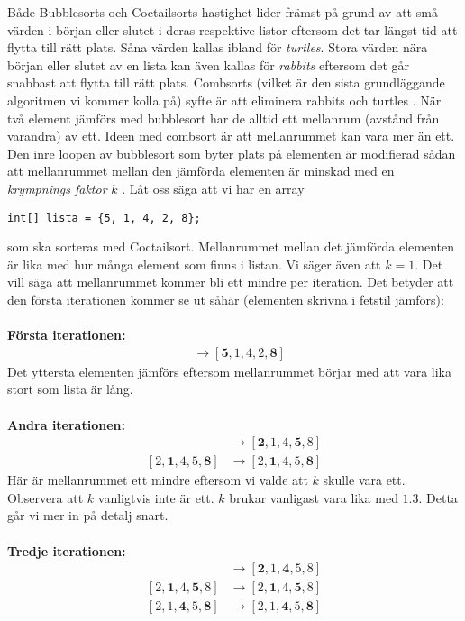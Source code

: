 \documentclass[a4, oneside]{report}
\begin{document}
Både Bubblesorts och Coctailsorts hastighet lider främst på grund av att små värden i början eller slutet i deras respektive listor eftersom det tar längst tid att flytta till rätt plats. Såna värden kallas ibland för \textit{turtles}. Stora värden nära början eller slutet av en lista kan även kallas för \textit{rabbits} eftersom det går snabbast att flytta till rätt plats. Combsorts (vilket är den sista grundläggande algoritmen vi kommer kolla på) syfte är att eliminera rabbits och turtles \cite{10}. När två element jämförs med bubblesort har de alltid ett mellanrum (avstånd från varandra) av ett. Ideen med combsort är att mellanrummet kan vara mer än ett. Den inre loopen av bubblesort som byter plats på elementen är modifierad sådan att mellanrummet mellan den jämförda elementen är minskad med en \textit{krympnings faktor} $k$ \cite{9}.  Låt oss säga att vi har en array
\begin{lstlisting}[style=mystyle, numbers=none]
 int[] lista = {5, 1, 4, 2, 8};
\end{lstlisting}
som ska sorteras med Coctailsort. Mellanrummet mellan det jämförda elementen är lika med hur många element som finns i listan. Vi säger även att $k=1$. Det vill säga att mellanrummet kommer bli ett mindre per iteration. Det betyder att den första iterationen kommer se ut såhär (elementen skrivna i fetstil jämförs):\\\\
\textbf{Första iterationen:}
\begin{align*}
    [\textbf{5}, 1, 4, 2, \textbf{8}] &\rightarrow [\textbf{5}, 1, 4, 2, \textbf{8}]
\end{align*}
Det yttersta elementen jämförs eftersom mellanrummet börjar med att vara lika stort som lista är lång.\\\\
\textbf{Andra iterationen:}
\begin{align*}
    [\textbf{5}, 1, 4, \textbf{2}, 8] &\rightarrow [\textbf{2}, 1, 4, \textbf{5}, 8]\\
    [2, \textbf{1}, 4, 5, \textbf{8}] &\rightarrow [2, \textbf{1}, 4, 5, \textbf{8}]
\end{align*}
Här är mellanrummet ett mindre eftersom vi valde att $k$ skulle vara ett. Observera att $k$ vanligtvis inte är ett. $k$ brukar vanligast vara lika med $1.3$. Detta går vi mer in på detalj snart.\\\\
\textbf{Tredje iterationen:}
\begin{align*}
    [\textbf{2}, 1, \textbf{4}, 5, 8] &\rightarrow [\textbf{2}, 1, \textbf{4}, 5, 8]\\
    [2, \textbf{1}, 4, \textbf{5}, 8] &\rightarrow [2, \textbf{1}, 4, \textbf{5}, 8]\\
    [2, 1, \textbf{4}, 5, \textbf{8}] &\rightarrow [2, 1, \textbf{4}, 5, \textbf{8}]
\end{align*}
\end{document}
